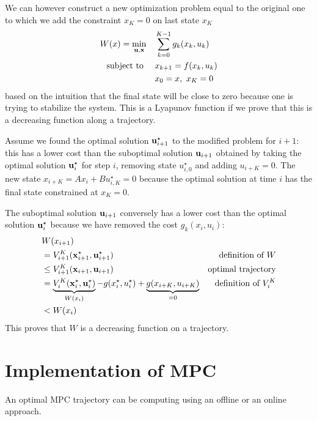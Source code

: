 We can however construct a new optimization problem equal to the original one to which we add the constraint $x_K=0$ on last state $x_K$
\begin{equation}
  \label{eq:lyapunov-tracking-MPC}
  \begin{aligned}
    W(x) = \min_{\boldsymbol{\mathrm{u}},\boldsymbol{\mathrm{x}}} &\quad \sum_{k=0}^{K-1} g_k(x_k,u_k) \\
    \text{subject to } &\quad x_{k+1} = f(x_k,u_k) \\
                                            &\quad  x_0 = x,\ x_K = 0
  \end{aligned}
\end{equation}
based on the intuition that the final state will be close to zero because one is trying to stabilize the system. This is a Lyapunov function if we prove that this is a decreasing function along a trajectory.

Assume we found the optimal solution $\boldsymbol{\mathrm{u}}_{i+1}^\star$ to the modified problem for $i+1$: this has a lower cost than the suboptimal solution $\boldsymbol{\mathrm{u}}_{i+1}$ obtained by taking the optimal solution $\boldsymbol{\mathrm{u}}_i^\star$ for step $i$, removing state $u_{i,0}^\star$ and adding $u_{i+K} = 0$. The new state $x_{i+K} = Ax_i+Bu_{i,K}^\star = 0$ because the optimal solution at time $i$ has the final state constrained at $x_K=0$.

The suboptimal solution $\boldsymbol{\mathrm{u}}_{i+1}$ conversely has a lower cost than the optimal solution $\boldsymbol{\mathrm{u}}_i^\star$ because we have removed the cost $g_k(x_i,u_i)$:
\begin{align*}
  & W(x_{i+1}) \\
  & = V_{i+1}^K(\boldsymbol{\mathrm{x}}_{i+1}^\star, \boldsymbol{\mathrm{u}}_{i+1}^\star) & \text{definition of $W$} \\
             & \leq V_{i+1}^K(\boldsymbol{\mathrm{x}}_{i+1}, \boldsymbol{\mathrm{u}}_{i+1}) & \text{optimal trajectory} \\
             & = \underbrace{V_i^K(\boldsymbol{\mathrm{x}}_i^\star, \boldsymbol{\mathrm{u}}_i^\star)}_{W(x_i)} - g(x_i^\star,u_i^\star) + \underbrace{g(x_{i+K},u_{i+K})}_{=0} & \text{definition of $V_i^K$} \\
  & < W(x_i)
\end{align*}
This proves that $W$ is a decreasing function on a trajectory.


\section{Implementation of MPC}
\label{sec:implementation-MPC}

An optimal MPC trajectory can be computing using an offline or an online approach.

